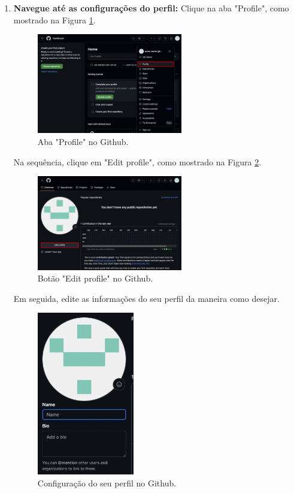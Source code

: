\begin{enumerate}
    \item \textbf{Navegue até as configurações do perfil:}
    Clique na aba "Profile", como mostrado na Figura \ref{fig:profile}. 
    
\begin{figure}[H]
\centering
\includegraphics[width=0.6\textwidth]{imgs/tutorial_criar_conta_github/4_profile.png}
\caption{Aba "Profile" no Github.}
\label{fig:profile}
\end{figure}

Na sequência, clique em "Edit profile", como mostrado na Figura \ref{fig:edit_profile}. 

    \begin{figure}[H]
\centering
\includegraphics[width=0.6\textwidth]{imgs/tutorial_criar_conta_github/5_edit_profile.png}
\caption{Botão "Edit profile" no Github.}
\label{fig:edit_profile}
\end{figure}

Em seguida, edite as informações do seu perfil da maneira como desejar.

    \begin{figure}[H]
\centering
\includegraphics[width=0.4\textwidth]{imgs/tutorial_criar_conta_github/6_edit_info.png}
\caption{Configuração do seu perfil no Github.}
\label{fig:edit_info}
\end{figure}


\end{enumerate}
